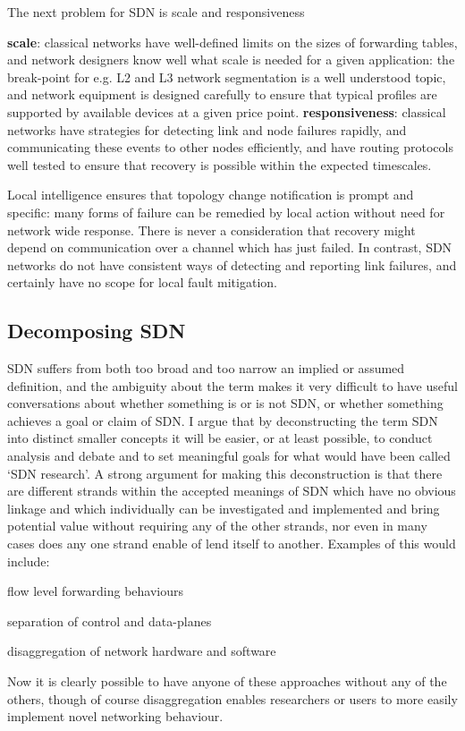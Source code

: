 The next problem for SDN is scale and responsiveness

\textbf{scale}: classical networks have well-defined limits on the sizes of forwarding tables, and network designers know well what scale is needed for a given application: the break-point for e.g. L2 and L3 network segmentation is a well understood topic, and network equipment is designed carefully to ensure that typical profiles are supported by available devices at a given price point.
\textbf{responsiveness}: classical networks have strategies for detecting link and node failures rapidly, and communicating these events to other nodes efficiently, and have routing protocols well tested to ensure that recovery is possible within the expected timescales.

Local intelligence ensures that topology change notification is prompt and specific: many forms of failure can be remedied by local action without need for network wide response.
There is never a consideration that recovery might depend on communication over a channel which has just failed.
In contrast, SDN networks do not have consistent ways of detecting and reporting link failures, and certainly have no scope for local fault mitigation.


\subsection{Decomposing SDN}
SDN suffers from both too broad and too narrow an implied or assumed definition, and the ambiguity about the term makes it very difficult to have useful conversations about whether something is or is not SDN, or whether something achieves a goal or claim of SDN.
I argue that by deconstructing the term SDN into distinct smaller concepts it will be easier, or at least possible, to conduct analysis and debate and to set meaningful goals for what would have been called ‘SDN research’.
A strong argument for making this deconstruction is that there are different strands within the accepted meanings of SDN which have no obvious linkage and which individually can be investigated and implemented and bring potential value without requiring any of the other strands, nor even in many cases does any one strand enable of lend itself to another.
Examples of this would include:
\begin{myitemize}
    \item flow level forwarding behaviours
    \item separation of control and data-planes
    \item disaggregation of network hardware and software
\end{myitemize}
Now it is clearly possible to have anyone of these approaches without any of the others, though of course disaggregation enables researchers or users to more easily implement novel networking behaviour.


